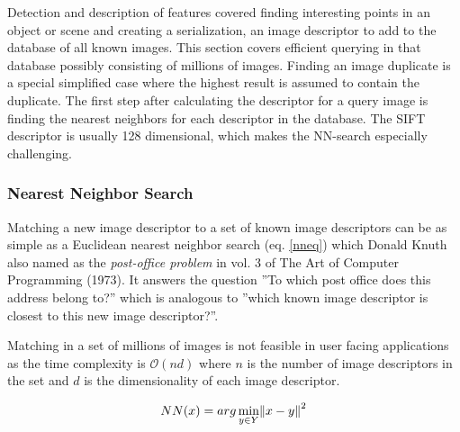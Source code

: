 \documentclass[english,12pt,a4paper,pdftex,elec,utf8, table]{aaltothesis}
\begin{document}
Detection and description of features covered finding interesting points in an object or scene and creating a serialization, an image descriptor to add to the database of all known images. This section covers efficient querying in that database possibly consisting of millions of images. Finding an image duplicate is a special simplified case where the highest result is assumed to contain the duplicate. The first step after calculating the descriptor for a query image is finding the nearest neighbors for each descriptor in the database. The SIFT descriptor is usually 128 dimensional, which makes the NN-search especially challenging.

\subsubsection{Nearest Neighbor Search}
Matching a new image descriptor to a set of known image descriptors can be as simple as a Euclidean nearest neighbor search (eq. \ref{nneq}) which Donald Knuth also named as the \emph{post-office problem} in vol. 3 of The Art of Computer Programming (1973). It answers the question ''To which post office does this address belong to?'' which is analogous to ''which known image descriptor is closest to this new image descriptor?''.

Matching in a set of millions of images is not feasible in user facing applications as the time complexity is $\mathcal{O}(nd)$ where $n$ is the number of image descriptors in the set and $d$ is the dimensionality of each image descriptor.


\begin{equation}
\label{nneq}
NN(x) = arg \min_{y\in Y}\norm{x-y}^2
\end{equation}
\end{document}
